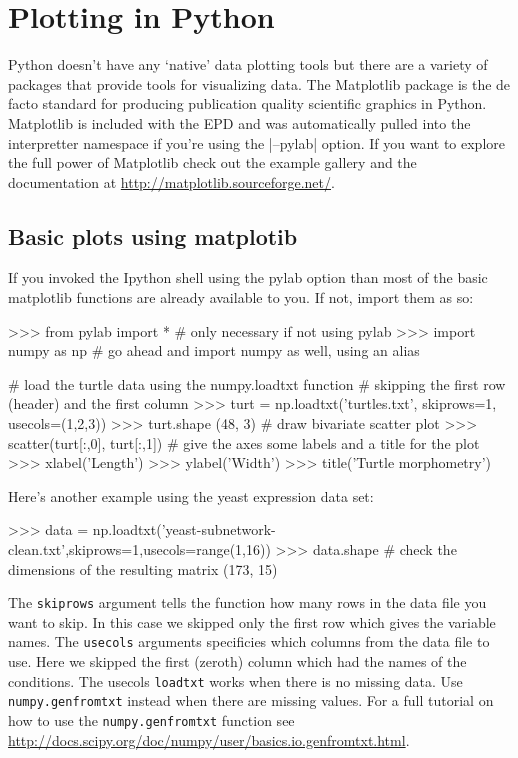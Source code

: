 
\section{Plotting in Python}

Python doesn't have any `native' data plotting tools but there are a
variety of packages that provide tools for visualizing data. The Matplotlib package is the de facto standard for producing
publication quality scientific graphics in Python. Matplotlib is
included with the EPD and was automatically pulled into the interpretter
namespace if you're using the \ipython |--pylab| option. If you want to explore the full power of Matplotlib check out the example
gallery and the documentation at
\url{http://matplotlib.sourceforge.net/}.

\subsection{Basic plots using matplotib}

If you invoked the Ipython shell using the pylab option than most of the
basic matplotlib functions are already available to you. If not, import
them as so:

\begin{python}
>>> from pylab import * # only necessary if not using pylab
>>> import numpy as np # go ahead and import numpy as well, using an alias

# load the turtle data using the numpy.loadtxt function 
# skipping the first row (header) and the first column 
>>> turt = np.loadtxt('turtles.txt', skiprows=1, 
                      usecols=(1,2,3))
>>> turt.shape
(48, 3)
# draw bivariate scatter plot
>>> scatter(turt[:,0], turt[:,1])
# give the axes some labels and a title for the plot
>>> xlabel('Length')
>>> ylabel('Width')
>>> title('Turtle morphometry')
\end{python}

Here's another example using the yeast expression data set:
%
\begin{python}
>>> data = np.loadtxt('yeast-subnetwork-clean.txt',skiprows=1,usecols=range(1,16))
>>> data.shape   # check the dimensions of the resulting matrix
(173, 15)
\end{python}
The \lstinline!skiprows! argument tells the function how many rows in
the data file you want to skip. In this case we skipped only the first
row which gives the variable names. The \lstinline!usecols! arguments
specificies which columns from the data file to use. Here we skipped the
first (zeroth) column which had the names of the conditions. The usecols
\lstinline!loadtxt! works when there is no missing data. Use
\lstinline!numpy.genfromtxt! instead when there are missing values. For
a full tutorial on how to use the \lstinline!numpy.genfromtxt! function
see
\url{http://docs.scipy.org/doc/numpy/user/basics.io.genfromtxt.html}.

